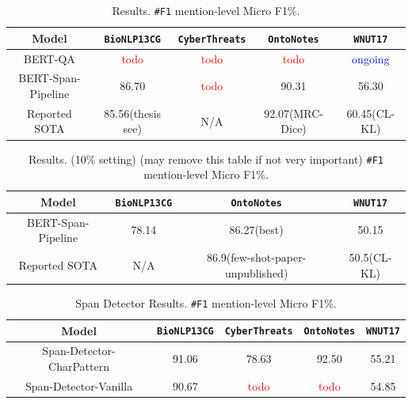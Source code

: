 \begin{table}[h!]
\centering
\begin{small}
\begin{tabular}{ccccc}\toprule
 \textbf{Model} & \texttt{BioNLP13CG} & \texttt{CyberThreats} & \texttt{OntoNotes} & \texttt{WNUT17} \\ \toprule 
BERT-QA & \textcolor{red}{todo} & \textcolor{red}{todo} & \textcolor{red}{todo}  & \textcolor{blue}{ongoing} \\
BERT-Span-Pipeline     & 86.70 & \textcolor{red}{todo} & 90.31 & 56.30  \\
Reported SOTA & 85.56(thesis see) & N/A & 92.07(MRC-Dice) & 60.45(CL-KL)  \\
\bottomrule
\end{tabular}
\caption{Results. \texttt{\#F1} mention-level Micro F1\%. }
\label{tab:main}
\end{small}
\end{table}

\begin{table}[h!]
\centering
\begin{small}
\begin{tabular}{cccc}\toprule
 \textbf{Model} & \texttt{BioNLP13CG} & \texttt{OntoNotes} & \texttt{WNUT17} \\ \toprule 
BERT-Span-Pipeline     & 78.14 & 86.27(best) & 50.15  \\
Reported SOTA & N/A & 86.9(few-shot-paper-unpublished) & 50.5(CL-KL)  \\
\bottomrule
\end{tabular}
\caption{Results. (10\% setting) (may remove this table if not very important) \texttt{\#F1} mention-level Micro F1\%.}
\label{tab:main}
\end{small}
\end{table}

\begin{table}[h!]
\centering
\begin{small}
\begin{tabular}{ccccc}\toprule
 \textbf{Model} & \texttt{BioNLP13CG} & \texttt{CyberThreats} & \texttt{OntoNotes} & \texttt{WNUT17} \\ \toprule 
Span-Detector-CharPattern & 91.06 & 78.63 & 92.50 & 55.21  \\
Span-Detector-Vanilla     & 90.67 & \textcolor{red}{todo} & \textcolor{red}{todo} & 54.85  \\
\bottomrule
\end{tabular}
\caption{Span Detector Results. \texttt{\#F1} mention-level Micro F1\%.}
\label{tab:det_ablation}
\end{small}
\end{table}

